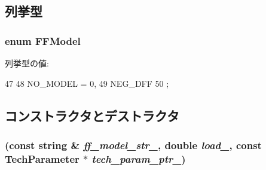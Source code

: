 \subsection{列挙型}
\hypertarget{classFlipFlop_a56818e5d3e33fce7656b2034c4456fa1}{
\subsubsection[{FFModel}]{\setlength{\rightskip}{0pt plus 5cm}enum {\bf FFModel}}}
\label{classFlipFlop_a56818e5d3e33fce7656b2034c4456fa1}
\begin{Desc}
\item[列挙型の値: ]\par
\begin{description}
\item[{\em 
\hypertarget{classFlipFlop_a56818e5d3e33fce7656b2034c4456fa1abab57b6e2c553e4d983f415a1f4ea75b}{
NO\_\-MODEL}
\label{classFlipFlop_a56818e5d3e33fce7656b2034c4456fa1abab57b6e2c553e4d983f415a1f4ea75b}
}]\item[{\em 
\hypertarget{classFlipFlop_a56818e5d3e33fce7656b2034c4456fa1ae18ef7a41f68a232ba011de6233358a9}{
NEG\_\-DFF}
\label{classFlipFlop_a56818e5d3e33fce7656b2034c4456fa1ae18ef7a41f68a232ba011de6233358a9}
}]\end{description}
\end{Desc}




\begin{DoxyCode}
47     {
48       NO_MODEL = 0,
49       NEG_DFF
50     };
\end{DoxyCode}


\subsection{コンストラクタとデストラクタ}
\hypertarget{classFlipFlop_ad1873b93cdb4d5cfa25037d8882855ed}{
\subsubsection[{FlipFlop}]{ (const string \& {\em ff\_\-model\_\-str\_\-}, \/  double {\em load\_\-}, \/  const {\bf TechParameter} $\ast$ {\em tech\_\-param\_\-ptr\_\-})}}
\label{classFlipFlop_ad1873b93cdb4d5cfa25037d8882855ed}



